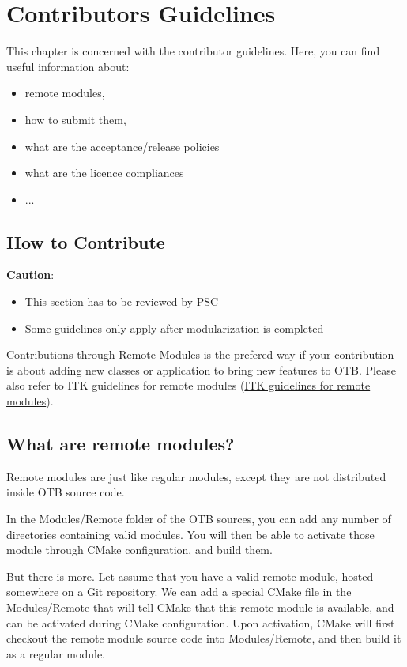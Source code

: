 \chapter{Contributors Guidelines}
\label{chapter:Contribute}

This chapter is concerned with the contributor guidelines.
Here, you can find useful information about:
\begin{itemize}
       \item remote modules, 
       \item how to submit them,
       \item what are the acceptance/release policies
       \item what are the licence compliances
       \item ...
\end{itemize}

\section{How to Contribute}

\textbf{Caution}: 
\begin{itemize}
       \item  This section has to be reviewed by PSC
       \item  Some guidelines only apply after modularization is completed 
\end{itemize}

Contributions through Remote Modules is the prefered way if your contribution is about adding new classes or application to bring new features to OTB. 
Please also refer to ITK guidelines for remote modules (\url{ITK guidelines for remote modules}).

\section{What are remote modules?}

Remote modules are just like regular modules, except they are not distributed inside OTB source code.

In the Modules/Remote folder of the OTB sources, you can add any number of directories containing valid modules. You will then be able to activate those module through CMake configuration, and build them.

But there is more. Let assume that you have a valid remote module, hosted somewhere on a Git repository. We can add a special CMake file in the Modules/Remote that will tell CMake that this remote module is available, and can be activated during CMake configuration. Upon activation, CMake will first checkout the remote module source code into Modules/Remote, and then build it as a regular module.

